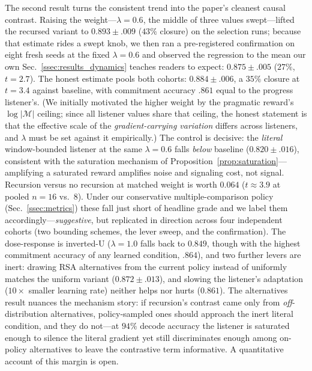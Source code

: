 \documentclass{article}
\begin{document}
The second result turns the consistent trend into the paper's cleanest causal contrast. Raising the weight---$\lambda=0.6$, the middle of three values swept---lifted the recursed variant to $0.893\pm.009$ ($43\%$ closure) on the selection runs; because that estimate rides a swept knob, we then ran a pre-registered confirmation on eight fresh seeds at the fixed $\lambda=0.6$ and observed the regression to the mean our own Sec.~\ref{ssec:results_dynamics} teaches readers to expect: $0.875\pm.005$ ($27\%$, $t=2.7$). The honest estimate pools both cohorts: $0.884\pm.006$, a $35\%$ closure at $t=3.4$ against baseline, with commitment accuracy $.861$ equal to the progress listener's. (We initially motivated the higher weight by the pragmatic reward's $\log|\mathcal{M}|$ ceiling; since all listener values share that ceiling, the honest statement is that the effective scale of the \emph{gradient-carrying variation} differs across listeners, and $\lambda$ must be set against it empirically.) The control is decisive: the \emph{literal} window-bounded listener at the same $\lambda=0.6$ falls \emph{below} baseline ($0.820\pm.016$), consistent with the saturation mechanism of Proposition~\ref{prop:saturation}---amplifying a saturated reward amplifies noise and signaling cost, not signal. Recursion versus no recursion at matched weight is worth $0.064$ ($t\approx3.9$ at pooled $n{=}16$ vs.\ $8$). Under our conservative multiple-comparison policy (Sec.~\ref{ssec:metrics}) these fall just short of headline grade and we label them accordingly---\emph{suggestive}, but replicated in direction across four independent cohorts (two bounding schemes, the lever sweep, and the confirmation). The dose-response is inverted-U ($\lambda=1.0$ falls back to $0.849$, though with the highest commitment accuracy of any learned condition, $.864$), and two further levers are inert: drawing RSA alternatives from the current policy instead of uniformly matches the uniform variant ($0.872\pm.013$), and slowing the listener's adaptation ($10\times$ smaller learning rate) neither helps nor hurts ($0.861$). The alternatives result nuances the mechanism story: if recursion's contrast came only from \emph{off}-distribution alternatives, policy-sampled ones should approach the inert literal condition, and they do not---at $94\%$ decode accuracy the listener is saturated enough to silence the literal gradient yet still discriminates enough among on-policy alternatives to leave the contrastive term informative. A quantitative account of this margin is open.
\end{document}
